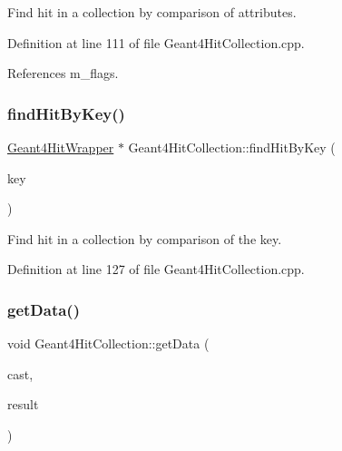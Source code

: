 Find hit in a collection by comparison of attributes. 



Definition at line 111 of file Geant4\+Hit\+Collection.\+cpp.



References m\+\_\+flags.

\hypertarget{class_d_d4hep_1_1_simulation_1_1_geant4_hit_collection_a912bb8ef9922058b0dbb3dbc5ee116bc}{}\label{class_d_d4hep_1_1_simulation_1_1_geant4_hit_collection_a912bb8ef9922058b0dbb3dbc5ee116bc} 
\subsubsection{\texorpdfstring{find\+Hit\+By\+Key()}{findHitByKey()}}
{\footnotesize\ttfamily \hyperlink{class_d_d4hep_1_1_simulation_1_1_geant4_hit_wrapper}{Geant4\+Hit\+Wrapper} $\ast$ Geant4\+Hit\+Collection\+::find\+Hit\+By\+Key (\begin{DoxyParamCaption}\item[{Volume\+ID}]{key }\end{DoxyParamCaption})\hspace{0.3cm}{\ttfamily [protected]}}



Find hit in a collection by comparison of the key. 



Definition at line 127 of file Geant4\+Hit\+Collection.\+cpp.

\hypertarget{class_d_d4hep_1_1_simulation_1_1_geant4_hit_collection_a86a7f5d549f5123ea1808952ed8cac57}{}\label{class_d_d4hep_1_1_simulation_1_1_geant4_hit_collection_a86a7f5d549f5123ea1808952ed8cac57} 
\subsubsection{\texorpdfstring{get\+Data()}{getData()}}
{\footnotesize\ttfamily void Geant4\+Hit\+Collection\+::get\+Data (\begin{DoxyParamCaption}\item[{const \hyperlink{class_d_d4hep_1_1_component_cast}{Component\+Cast} \&}]{cast,  }\item[{std\+::vector$<$ void $\ast$$>$ $\ast$}]{result }\end{DoxyParamCaption})\hspace{0.3cm}{\ttfamily [protected]}}



